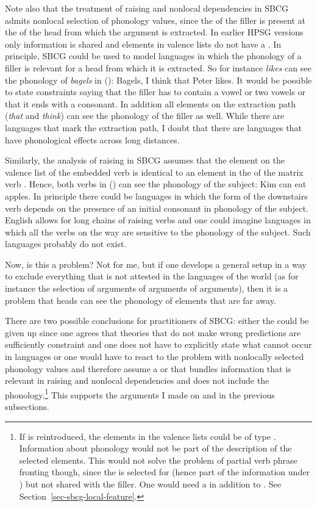 Note also that the treatment of raising and nonlocal dependencies in SBCG admits nonlocal selection of phonology
values, since the \formv of the filler is present at the \argstl of the head from which the argument
is extracted. In earlier HPSG versions only \local information is shared and elements in valence lists
do not have a \phonf. In principle, SBCG could be used to model languages in which the phonology of
a filler is relevant for a head from which it is extracted. So for instance \emph{likes} can see the
phonology of \emph{bagels} in ():
\ea
Bagels, I think that Peter likes.
\z
It would be possible to state constraints saying that the filler has to contain a vowel or two
vowels or that it ends with a consonant. In addition all elements on the extraction path
(\emph{that} and \emph{think}) can see the phonology of the filler as well. While there are
languages that mark the extraction path, I doubt that there are languages that have phonological
effects across long distances. 

Similarly, the analysis of raising in SBCG assumes that the element on the valence list of the
embedded verb is identical to an element in the \argstl of the matrix verb \citep[]{Sag2012a}. Hence, both verbs in () can see the phonology of the subject:
\ea
Kim can eat apples.
\z
In principle there could be languages in which the form of the downstairs verb depends on the
presence of an initial consonant in phonology of the subject. English allows for long chains of
raising verbs and one could imagine languages in which all the verbs on the way are sensitive to the
phonology of the subject. Such languages probably do not exist.

Now, is this a problem? Not for me, but if one develops a general setup in a
way to exclude everything that is not attested in the languages of the world (as for instance the
selection of arguments of arguments of arguments), then it is a problem that heads can see the
phonology of elements that are far away.

There are two possible conclusions for practitioners of SBCG: either the \motherf could be given up
since one agrees that theories that do not make wrong predictions are sufficiently constraint and
one does not have to explicitly state what cannot occur in languages or one would have to react to
the problem with nonlocally selected phonology values and therefore assume a \synsem or \localf that
bundles information that is relevant in raising and nonlocal dependencies and does not include the
phonology.\footnote{
  If \synsem is reintroduced, the elements in the valence lists could be of type
  . Information about phonology would not be part of the description of the selected elements. This would not solve the problem
  of partial verb phrase fronting though, since the \lexf is selected for (hence part of the
  information under \synsem) but not shared with the filler. One would need a \localf in addition to \synsem. See Section~\ref{sec-sbcg-local-feature}.
}
This supports the arguments I made on \mother and
\local in the previous subsections.

